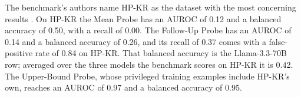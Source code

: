 The benchmark's authors name HP-KR as the dataset with the most concerning results \parencite[p.~10]{kretschmar2025liars}.
On HP-KR the Mean Probe has an AUROC of 0.12 and a balanced accuracy of 0.50, with a recall of 0.00. %
The Follow-Up Probe has an AUROC of 0.14 and a balanced accuracy of 0.26, and its recall of 0.37 comes with a false-positive rate of 0.84 on HP-KR. %
That balanced accuracy is the Llama-3.3-70B row; averaged over the three models the benchmark scores on HP-KR it is 0.42. %
The Upper-Bound Probe, whose privileged training examples include HP-KR's own, reaches an AUROC of 0.97 and a balanced accuracy of 0.95. %

